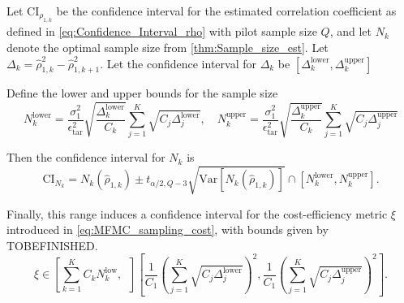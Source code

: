 %
\begin{theorem}
\label{thm:Sample_size_est_conf_interval} 
Let $\text{CI}_{\rho_{1,k}}$ be the confidence interval for the estimated correlation coefficient as defined in \eqref{eq:Confidence_Interval_rho} with pilot sample size $Q$, and let $N_k$ denote the optimal sample size from \eqref{thm:Sample_size_est}. Let
$\Delta_k = \widehat \rho_{1,k}^2 - \widehat\rho_{1,k+1}^2.$ Let the confidence interval for $\Delta_k$ be $\left[\Delta_k^{\text{lower}},\Delta_k^{\text{upper}}\right]$

Define the lower and upper bounds for the sample size
%
\begin{equation}\label{eq:upper_lower_N_k}
    N_k^{\text{lower}} = \frac{\sigma_1^2}{\epsilon_{\text{tar}}^2}\sqrt{\frac{\Delta_k^{\text{lower}}}{C_k}}\sum_{j=1}^K\sqrt{C_j\Delta_j^{\text{lower}}},\quad N_k^{\text{upper}} = \frac{\sigma_1^2}{\epsilon_{\text{tar}}^2}\sqrt{\frac{\Delta_k^{\text{upper}}}{C_k}}\sum_{j=1}^K\sqrt{C_j\Delta_j^{\text{upper}}}
\end{equation}


%
Then the confidence interval for $N_k$ is
%
\[
\text{CI}_{N_k} = N_k\left(\widehat\rho_{1,k}\right)\pm t_{\alpha/2,Q-3}\sqrt{\text{Var}\left[N_k\left(\widehat\rho_{1,k}\right)\right]}\cap \left[N_k^{\text{lower}}, N_k^{\text{upper}}\right].
\]
%
\end{theorem}



Finally, this range induces a confidence interval for the cost-efficiency metric $\xi$ introduced in \eqref{eq:MFMC_sampling_cost}, with bounds given by TOBEFINISHED.
%
\begin{equation}\label{eq:MFMC_sampling_cost_efficiency_CI}
    \xi \in  \left[\sum_{k=1}^K C_k N_k^{\text{low}},\;\; \right]\left[\frac{1}{C_1} \left(\sum_{j=1}^K\sqrt{C_j\Delta_j^{\text{lower}}}\right)^2,\frac{1}{C_1} \left(\sum_{j=1}^K\sqrt{C_j\Delta_j^{\text{upper}}}\right)^2\right].
\end{equation}
%

